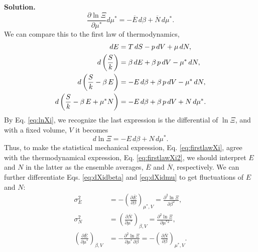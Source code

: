 \documentclass[twocolumn, 10pt]{article}
\numberwithin{equation}{section}
\newenvironment{solution}
{\par\medskip
  \textbf{Solution. }\ignorespaces}
{\medskip}
\begin{document}
\begin{solution}
\begin{equation}
  \frac{ \partial \ln \Xi } { \partial \mu^* } d\mu^*
  = -\overline E \, d\beta + \overline N \, d\mu^*
  .
  \label{eq:firstlawXi}
\end{equation}
%
We can compare this to the first law of thermodynamics,
%
\begin{align}
  dE
  &= T \, dS - p \, dV + \mu \, dN
  ,
  \notag
  \\
  d\left(\frac{S}{k} \right)
  &= \beta \, dE + \beta \, p \, dV - \mu^* \, dN
  ,
  \notag
  \\
  d\left(\frac{S}{k} - \beta \, E \right)
  &= -E \, d\beta + \beta \, p \, dV - \mu^* \, dN
  ,
  \label{eq:firstlaw_bVN}
  \\
  d\left(\frac{S}{k} - \beta \, E + \mu^* N \right)
  &= -E \, d\beta + \beta \, p \, dV + N \, d\mu^*
  .
  \notag
\end{align}
%
By Eq. \eqref{eq:lnXi},
we recognize the last expression
is the differential of $\ln \Xi$,
and with a fixed volume, $V$
it becomes
%
\begin{equation}
  d\ln \Xi = -E \, d\beta + N \, d\mu^*
  .
  \label{eq:firstlawXi2}
\end{equation}
%
Thus, to make the statistical mechanical expression, Eq. \eqref{eq:firstlawXi},
agree with the thermodynamical expression, Eq. \eqref{eq:firstlawXi2},
we should interpret $E$ and $N$ in the latter
as the ensemble averages, $\overline E$ and $\overline N$, respectively.
%
We can further differentiate
Eqs. \eqref{eq:dXidbeta} and \eqref{eq:dXidmu}
to get fluctuations of $E$ and $N$:
%
\begin{align}
  \sigma_E^2
  &=
  -\left( \frac{ \partial \overline E } { \partial \beta } \right)_{\mu^*, V}
  = \frac{ \partial^2 \ln \Xi } { \partial \beta^2 }
  ,
  \label{eq:varE}
  \\
  \sigma_N^2
  &= \left( \frac{ \partial \overline N } { \partial \mu^* } \right)_{\beta, V}
  = \frac{ \partial^2 \ln \Xi } { \partial \mu^{*2} }
  \label{eq:varN}
  ,
  \\
  \left( \frac{ \partial \overline E } { \partial \mu^* } \right)_{\beta, V}
  &= -\frac{ \partial^2 \ln \Xi } { \partial \mu^* \, \partial \beta }
  = - \left( \frac{ \partial \overline N } { \partial \beta } \right)_{\mu^*, V}
  \label{eq:covEN}
  .
\end{align}


\end{solution}
\end{document}
